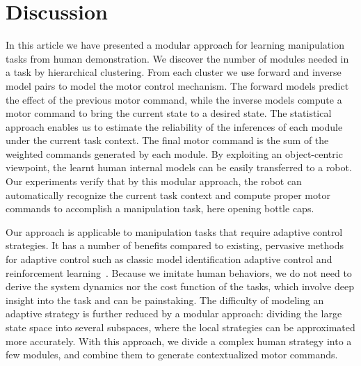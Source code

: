 \section{Discussion}
\label{sec:diss}


In this article we have presented a modular approach for learning
manipulation tasks from human demonstration. We discover the number of
modules needed in a task by hierarchical clustering. From each cluster
we use forward and inverse model pairs to model the motor control
mechanism. The forward models predict the effect of the previous motor
command, while the inverse models compute a motor command to bring the
current state to a desired state. The statistical approach enables us
to estimate the reliability of the inferences of each module under the
current task context. The final motor command is the sum of the weighted
commands generated by each module. By exploiting an object-centric
viewpoint, the learnt human internal models can be easily transferred
to a robot. Our experiments verify that by this modular approach, the
robot can automatically recognize the current task context and compute
proper motor commands to accomplish a manipulation task, here opening
bottle caps.


Our approach is applicable to manipulation tasks that require adaptive
control strategies. It has a number of benefits compared to existing,
pervasive methods for adaptive control such as classic model
identification adaptive control and reinforcement
learning~\citep{narendra1995adaptation,khalil2004modeling,buchli2011learning}. %
Because we imitate human behaviors, we do not need to derive the
system dynamics nor the cost function of the tasks, which involve deep
insight into the task and can be painstaking. The difficulty of
modeling an adaptive strategy is further reduced by a modular
approach: dividing the large state space into several subspaces, where
the local strategies can be approximated more accurately. With this
approach, we divide a complex human strategy into a few modules, and
combine them to generate contextualized motor commands.

